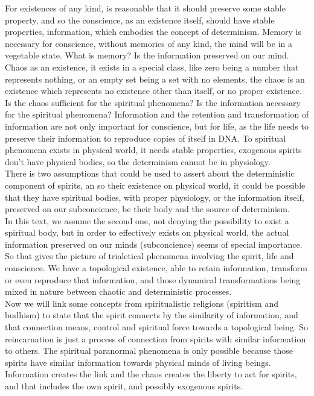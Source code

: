 \documentclass[12pt,a4paper]{article}
\begin{document}
For existences of any kind, is reasonable that it should preserve some stable property, and so the conscience, as an existence itself, should have stable properties, information, which embodies the concept of determinism. Memory is necessary for conscience, without memories of any kind, the mind will be in a vegetable state. What is memory? Is the information preserved on our mind.\\

Chaos as an existence, it exists in a special class, like zero being a number that represents nothing, or an empty set being a set with no elements, the chaos is an existence which represents no existence other than itself, or no proper existence.\\

Is the chaos sufficient for the spiritual phenomena? Is the information necessary for the spiritual phenomena? Information and the retention and transformation of information are not only important for conscience, but for life, as the life needs to preserve their information to reproduce copies of itself in DNA. To spiritual phenomena exists in physical world, it needs stable properties, exogenous spirits don't have physical bodies, so the determinism cannot be in physiology.\\

There is two assumptions that could be used to assert about the deterministic component of spirits, an so their existence on physical world, it could be possible that they have spiritual bodies, with proper physiology, or the information itself, preserved on our subconcience, be their body and the source of determinism. \\

In this text, we assume the second one, not denying the possibility to exist a spiritual body, but in order to effectively exists on physical world, the actual information preserved on our minds (subconcience) seems of special importance.\\

So that gives the picture of trialetical phenomena involving the spirit, life and conscience. We have a topological existence, able to retain information, transform or even reproduce that information, and those dynamical transformations being mixed in nature between chaotic and deterministic processes.\\

Now we will link some concepts from spiritualistic religions (spiritism and budhism) to state that the spirit connects by the similarity of information, and that connection means, control and spiritual force towards a topological being. So reincarnation is just a process of connection from spirits with similar information to others. The spiritual paranormal phenomena is only possible because those spirits have similar information towards physical minds of living beings. Information creates the link and the chaos creates the liberty to act for spirits, and that includes the own spirit, and possibly exogenous spirits.
\end{document}
